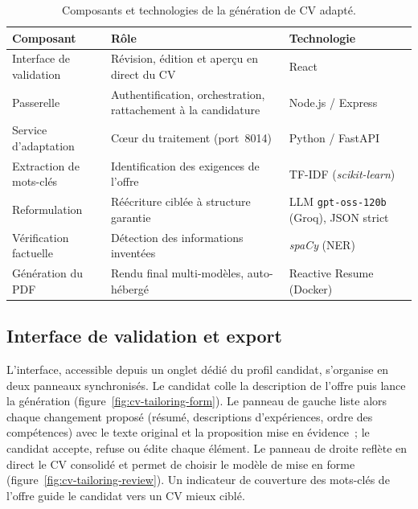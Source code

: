 \begin{table}[H]
  \centering
  \footnotesize
  \renewcommand{\arraystretch}{1.3}
  \setlength{\tabcolsep}{5pt}
  \begin{tabularx}{\textwidth}{|>{\raggedright\arraybackslash}p{3.6cm}|>{\raggedright\arraybackslash}X|>{\raggedright\arraybackslash}p{4.2cm}|}
    \hline
    \rowcolor{blue!10}
    \textbf{Composant} & \textbf{Rôle} & \textbf{Technologie} \\
    \hline
    Interface de validation & Révision, édition et aperçu en direct du CV & React \\
    \hline
    Passerelle & Authentification, orchestration, rattachement à la candidature & Node.js / Express \\
    \hline
    Service d'adaptation & Cœur du traitement (port~8014) & Python / FastAPI \\
    \hline
    Extraction de mots-clés & Identification des exigences de l'offre & TF-IDF (\textit{scikit-learn}) \\
    \hline
    Reformulation & Réécriture ciblée à structure garantie & LLM \texttt{gpt-oss-120b} (Groq), JSON strict \\
    \hline
    Vérification factuelle & Détection des informations inventées & \textit{spaCy} (NER) \\
    \hline
    Génération du PDF & Rendu final multi-modèles, auto-hébergé & Reactive Resume (Docker) \\
    \hline
  \end{tabularx}
  \caption{Composants et technologies de la génération de CV adapté.}
  \label{tab:cv-tailoring-stack}
\end{table}

\subsection{Interface de validation et export}

L'interface, accessible depuis un onglet dédié du profil candidat, s'organise en deux panneaux synchronisés. Le candidat colle la description de l'offre puis lance la génération (figure~\ref{fig:cv-tailoring-form}). Le panneau de gauche liste alors chaque changement proposé (résumé, descriptions d'expériences, ordre des compétences) avec le texte original et la proposition mise en évidence~; le candidat accepte, refuse ou édite chaque élément. Le panneau de droite reflète en direct le CV consolidé et permet de choisir le modèle de mise en forme (figure~\ref{fig:cv-tailoring-review}). Un indicateur de couverture des mots-clés de l'offre guide le candidat vers un CV mieux ciblé.

